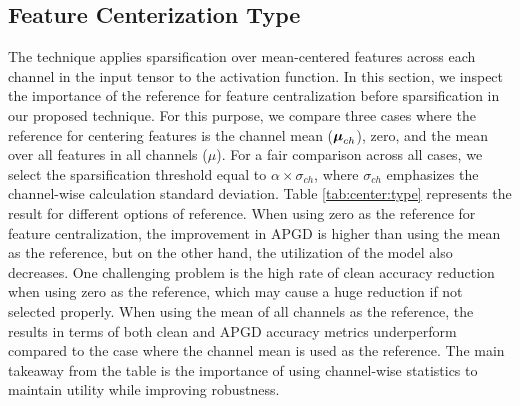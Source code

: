 \documentclass[conference]{IEEEtran}
\begin{document}
\subsection{Feature Centerization Type}\label{abl:center}
The \sys technique applies sparsification over mean-centered features across each channel in the input tensor to the activation function. In this section, we inspect the importance of the reference for feature centralization before sparsification in our proposed technique. For this purpose, we compare three cases where the reference for centering features is the channel mean ($\boldsymbol{\mu}_{ch}$), zero, and the mean over all features in all channels ($\mu$). For a fair comparison across all cases, we select the sparsification threshold equal to $\alpha \times \sigma_{ch}$, where $\sigma_{ch}$ emphasizes the channel-wise calculation standard deviation. Table \ref{tab:center:type} represents the result for different options of reference. When using zero as the reference for feature centralization, the improvement in APGD is higher than using the mean as the reference, but on the other hand, the utilization of the model also decreases. One challenging problem is the high rate of clean accuracy reduction when using zero as the reference, which may cause a huge reduction if not selected properly. When using the mean of all channels as the reference, the results in terms of both clean and APGD accuracy metrics underperform compared to the case where the channel mean is used as the reference. The main takeaway from the table is the importance of using channel-wise statistics to maintain utility while improving robustness.
\end{document}
